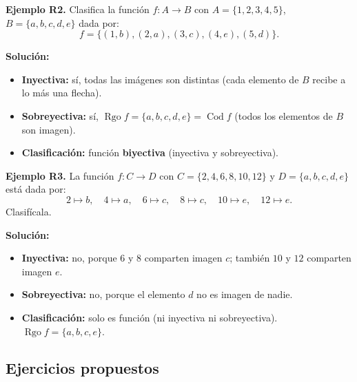 \documentclass[12pt, letterpaper]{article}
\begin{document}

\textbf{Ejemplo R2.} Clasifica la función $f: A \rightarrow B$ con $A = \{1, 2, 3, 4, 5\}$, $B = \{a, b, c, d, e\}$ dada por:
$$f = \{(1, b), (2, a), (3, c), (4, e), (5, d)\}.$$

\begin{cuadrosolucion}
  \textbf{Solución:}
  \begin{itemize}
    \item \textbf{Inyectiva:} sí, todas las imágenes son distintas (cada elemento de $B$ recibe a lo más una flecha).
    \item \textbf{Sobreyectiva:} sí, $\operatorname{Rgo} f = \{a, b, c, d, e\} = \operatorname{Cod} f$ (todos los elementos de $B$ son imagen).
    \item \textbf{Clasificación:} función \textbf{biyectiva} (inyectiva y sobreyectiva).
  \end{itemize}
\end{cuadrosolucion}

\textbf{Ejemplo R3.} La función $f: C \rightarrow D$ con $C = \{2, 4, 6, 8, 10, 12\}$ y $D = \{a, b, c, d, e\}$ está dada por:
$$2 \mapsto b, \quad 4 \mapsto a, \quad 6 \mapsto c, \quad 8 \mapsto c, \quad 10 \mapsto e, \quad 12 \mapsto e.$$
Clasifícala.

\begin{cuadrosolucion}
  \textbf{Solución:}
  \begin{itemize}
    \item \textbf{Inyectiva:} no, porque $6$ y $8$ comparten imagen $c$; también $10$ y $12$ comparten imagen $e$.
    \item \textbf{Sobreyectiva:} no, porque el elemento $d$ no es imagen de nadie.
    \item \textbf{Clasificación:} solo es función (ni inyectiva ni sobreyectiva). $\operatorname{Rgo} f = \{a, b, c, e\}$.
  \end{itemize}
\end{cuadrosolucion}

\subsection{Ejercicios propuestos}
\end{document}

